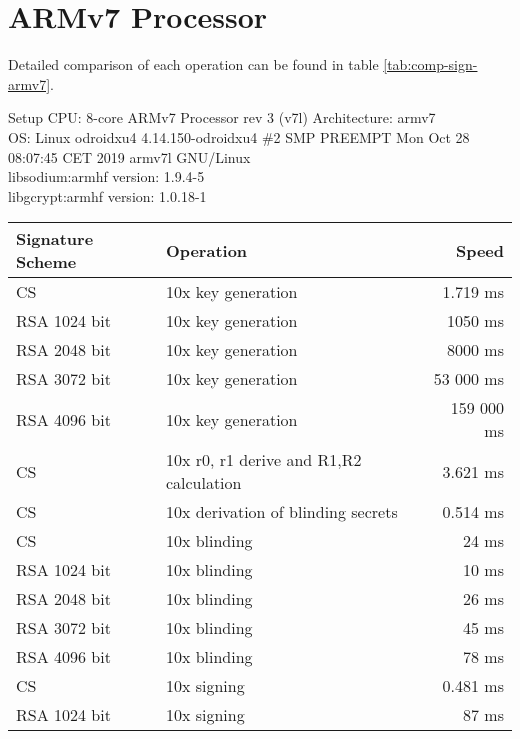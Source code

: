 \section{ARMv7 Processor}
Detailed comparison of each operation can be found in table \ref{tab:comp-sign-armv7}.
\begin{bfhBox}{Setup}
	CPU:  8-core ARMv7 Processor rev 3 (v7l)
    Architecture: armv7 \\
    OS: Linux odroidxu4 4.14.150-odroidxu4 \#2 SMP PREEMPT Mon Oct 28 08:07:45 CET 2019 armv7l GNU/Linux\\
    libsodium:armhf version: 1.9.4-5   \\ 
    libgcrypt:armhf version: 1.0.18-1
\end{bfhBox}

\begin{table}[ht]
    \centering
    \setupBfhTabular
    \begin{tabular}{llr}
        \rowcolor{BFH-tablehead}
        \textbf{Signature Scheme} & \textbf{Operation} & \textbf{Speed} \\\hline
        CS & 10x key generation & 1.719 ms \\\hline
        RSA 1024 bit & 10x key generation & 1050 ms \\\hline
        RSA 2048 bit & 10x key generation & 8000 ms \\\hline
        RSA 3072 bit & 10x key generation & 53 000 ms \\\hline
        RSA 4096 bit & 10x key generation & 159 000 ms \\\hline
        \hline
        CS & 10x r0, r1 derive and R1,R2 calculation & 3.621 ms \\\hline
        CS & 10x derivation of blinding secrets & 0.514 ms \\\hline
        CS & 10x blinding & 24 ms \\\hline
        RSA 1024 bit & 10x blinding & 10 ms \\\hline
        RSA 2048 bit & 10x blinding & 26 ms \\\hline
        RSA 3072 bit & 10x blinding & 45 ms \\\hline
        RSA 4096 bit & 10x blinding & 78 ms \\\hline
        \hline
        CS & 10x signing & 0.481 ms \\\hline
        RSA 1024 bit & 10x signing & 87 ms \\\hline

\end{tabular}
\end{table}
